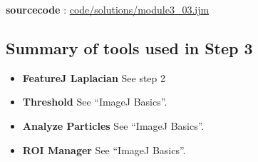 \textbf{sourcecode} : \href{https://github.com/miura/mod3conversionTest2/blob/struct_authorea/module3_03.ijm}{code/solutions/module3\_03.ijm}

\subsection{Summary of tools used in Step 3}

\begin{itemize}
\item\textbf{FeatureJ Laplacian} See step 2

\item\textbf{Threshold} See ``ImageJ Basics''.
\item\textbf{Analyze Particles} See ``ImageJ Basics''.
\item\textbf{ROI Manager} See ``ImageJ Basics''.

\end{itemize}

\newpage
